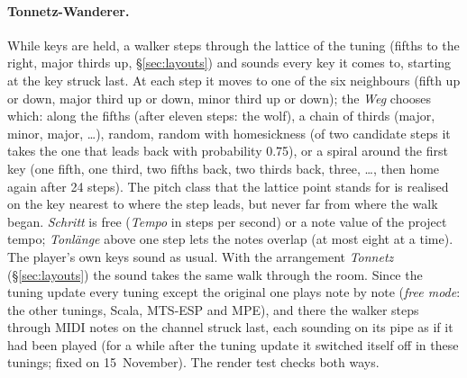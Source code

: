 \documentclass[11pt,a4paper,parskip=half,DIV=11,toc=bibliography]{scrartcl}
\newcommand{\ui}[1]{\emph{#1}}                 %
\begin{document}
\paragraph{Tonnetz-Wanderer.} While keys are held, a walker steps through the lattice of the tuning (fifths to the right, major thirds
up, \S\ref{sec:layouts}) and sounds every key it comes to, starting at the key struck last. At each step it moves to one of the six
neighbours (fifth up or down, major third up or down, minor third up or down); the \ui{Weg} chooses which: along the
fifths (after eleven steps: the wolf), a chain of thirds (major, minor, major, \dots), random, random with homesickness (of two
candidate steps it takes the one that leads back with probability 0.75), or a spiral around the first key (one fifth, one third, two fifths back,
two thirds back, three, \dots, then home again after 24 steps). The pitch class that the lattice point stands for is realised on the key nearest
to where the step leads, but never far from where the walk began. \ui{Schritt} is free (\ui{Tempo} in steps per second) or a note value of
the project tempo; \ui{Tonlänge} above one step lets the notes overlap (at most eight at a time). The player's own keys sound as usual.
With the arrangement \ui{Tonnetz} (\S\ref{sec:layouts}) the sound takes the same walk through the room. Since the tuning update every tuning
except the original one plays note by note (\emph{free mode}: the other tunings, Scala, MTS-ESP and MPE), and there the walker steps through MIDI
notes on the channel struck last, each sounding on its pipe as if it had been played (for a while after the tuning update it switched itself
off in these tunings; fixed on 15~November). The render test checks both ways.
\end{document}

